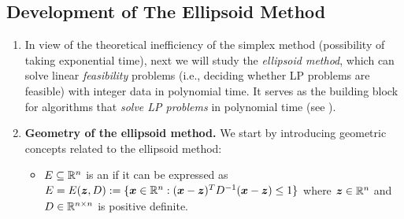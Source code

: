 \subsection{Development of The Ellipsoid Method}
\begin{enumerate}
\item In view of the theoretical inefficiency of the simplex method
(possibility of taking exponential time), next we will study the
\emph{ellipsoid method}, which can solve linear \emph{feasibility} problems
(i.e., deciding whether LP problems are feasible) with integer data in
polynomial time. It serves as the building block for algorithms that
\emph{solve LP problems} in polynomial time (see ).

\item\label{it:ellip-method-geo} \textbf{Geometry of the ellipsoid method.} We start by introducing
geometric concepts related to the ellipsoid method:
\begin{itemize}
\item \(E\subseteq \mathbb{R}^n\) is an  if it can be expressed as
\(E=E(\bm{z},D):=\{\bm{x}\in\mathbb{R}^n:(\bm{x}-\bm{z})^{T}D^{-1}(\bm{x}-\bm{z})\le 1\}\)
where \(\bm{z}\in\mathbb{R}^n\) and \(D\in\mathbb{R}^{n\times n}\) is positive definite.
\begin{center}
\end{center}

\end{itemize}
\end{enumerate}
